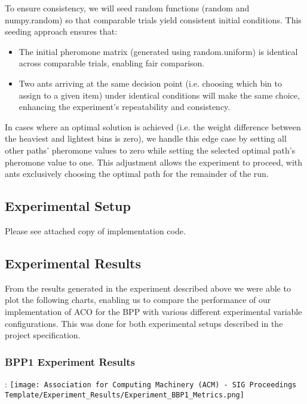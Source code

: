 \documentclass[sigconf]{acmart}
\begin{document}
            To ensure consistency, we will seed random functions (random and numpy.random) so that comparable trials yield consistent initial conditions. This seeding approach ensures that:
            \begin{itemize}
                \item The initial pheromone matrix (generated using random.uniform) is identical across comparable trials, enabling fair comparison.
                \item Two ants arriving at the same decision point (i.e. choosing which bin to assign to a given item) under identical conditions will make the same choice, enhancing the experiment’s repeatability and consistency.\newline
            \end{itemize}

            In cases where an optimal solution is achieved (i.e. the weight difference between the heaviest and lightest bins is zero), we handle this edge case by setting all other paths' pheromone values to zero while setting the selected optimal path’s pheromone value to one. This adjustment allows the experiment to proceed, with ants exclusively choosing the optimal path for the remainder of the run.\newline

        \subsection{Experimental Setup}
            Please see attached copy of implementation code.
            
        \subsection{Experimental Results}
            From the results generated in the experiment described above we were able to plot the following charts, enabling us to compare the performance of our implementation of ACO for the BPP with various different experimental variable configurations. This was done for both experimental setups described in the project specification.\newpage

            \subsubsection{BPP1 Experiment Results}:\newline
                \texttt{[image: Association for Computing Machinery (ACM) - SIG Proceedings Template/Experiment\_Results/Experiment\_BBP1\_Metrics.png]}\newline
\end{document}
